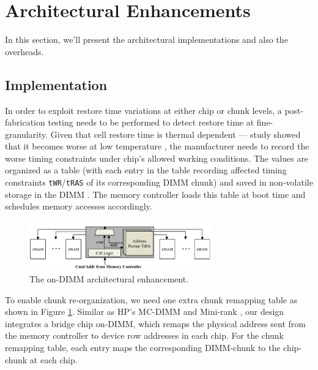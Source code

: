 \section{Architectural Enhancements}
In this section, we'll present the architectural implementations and also the overheads.

\subsection{Implementation}
In order to exploit restore time variations at either chip or chunk levels, a post-fabrication testing needs to be performed to detect restore time at fine-granularity. Given that cell restore time is thermal dependent --- study showed that it becomes worse at low temperature \cite{MEM14:twr}, the manufacturer needs to record the worse timing constraints under chip's allowed working conditions. The values are organized as a table (with each entry in the table recording affected timing constraints {\tt tWR}/{\tt tRAS} of its corresponding DIMM chunk) and saved in non-volatile storage in the DIMM \cite{MICRO13:rowclone}. The memory controller loads this table at boot time and schedules memory accesses accordingly.%

\begin{figure}[ht] %
\begin{center}
\includegraphics[width=0.7\textwidth]{figures/TODAES_data/design.pdf}
\vspace{-0.2in}
\caption{The on-DIMM architectural enhancement.}
\label{fig:design}
\end{center}
\end{figure}

To enable chunk re-organization, we need one extra chunk remapping table as shown in Figure \ref{fig:design}. Similar as HP's MC-DIMM \cite{SC09:mcdimm} and Mini-rank \cite{MICRO08:minirank}, our design integrates a bridge chip on-DIMM, which remaps the physical address sent from the memory controller to device row addresses in each chip. For the chunk remapping table, each entry maps the corresponding DIMM-chunk to the chip-chunk at each chip.  

